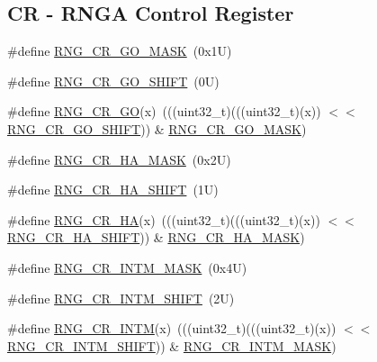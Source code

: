 \subsection*{CR -\/ R\+N\+GA Control Register}
\begin{DoxyCompactItemize}
\item 
\#define \mbox{\hyperlink{group___r_n_g___register___masks_ga2aebfd44952b9acb9854f17cbb241dc3}{R\+N\+G\+\_\+\+C\+R\+\_\+\+G\+O\+\_\+\+M\+A\+SK}}~(0x1\+U)
\item 
\#define \mbox{\hyperlink{group___r_n_g___register___masks_ga33164b67927c62a20a5cc0ebf24a6dec}{R\+N\+G\+\_\+\+C\+R\+\_\+\+G\+O\+\_\+\+S\+H\+I\+FT}}~(0\+U)
\item 
\#define \mbox{\hyperlink{group___r_n_g___register___masks_ga179fde31f28a4cd70ad1513eb466a0ee}{R\+N\+G\+\_\+\+C\+R\+\_\+\+GO}}(x)~(((uint32\+\_\+t)(((uint32\+\_\+t)(x)) $<$$<$ \mbox{\hyperlink{group___r_n_g___register___masks_ga33164b67927c62a20a5cc0ebf24a6dec}{R\+N\+G\+\_\+\+C\+R\+\_\+\+G\+O\+\_\+\+S\+H\+I\+FT}})) \& \mbox{\hyperlink{group___r_n_g___register___masks_ga2aebfd44952b9acb9854f17cbb241dc3}{R\+N\+G\+\_\+\+C\+R\+\_\+\+G\+O\+\_\+\+M\+A\+SK}})
\item 
\#define \mbox{\hyperlink{group___r_n_g___register___masks_ga771a9a36a3856ec15886952dd5881e67}{R\+N\+G\+\_\+\+C\+R\+\_\+\+H\+A\+\_\+\+M\+A\+SK}}~(0x2\+U)
\item 
\#define \mbox{\hyperlink{group___r_n_g___register___masks_ga003221e3c2c56d155f0144d99b9daa28}{R\+N\+G\+\_\+\+C\+R\+\_\+\+H\+A\+\_\+\+S\+H\+I\+FT}}~(1\+U)
\item 
\#define \mbox{\hyperlink{group___r_n_g___register___masks_ga229f4a80160cd677797326cee5eb8588}{R\+N\+G\+\_\+\+C\+R\+\_\+\+HA}}(x)~(((uint32\+\_\+t)(((uint32\+\_\+t)(x)) $<$$<$ \mbox{\hyperlink{group___r_n_g___register___masks_ga003221e3c2c56d155f0144d99b9daa28}{R\+N\+G\+\_\+\+C\+R\+\_\+\+H\+A\+\_\+\+S\+H\+I\+FT}})) \& \mbox{\hyperlink{group___r_n_g___register___masks_ga771a9a36a3856ec15886952dd5881e67}{R\+N\+G\+\_\+\+C\+R\+\_\+\+H\+A\+\_\+\+M\+A\+SK}})
\item 
\#define \mbox{\hyperlink{group___r_n_g___register___masks_gaeb6ea10a08f7c854d7a2d566afbc509a}{R\+N\+G\+\_\+\+C\+R\+\_\+\+I\+N\+T\+M\+\_\+\+M\+A\+SK}}~(0x4\+U)
\item 
\#define \mbox{\hyperlink{group___r_n_g___register___masks_ga3e492e16a9a75e903cc108e526b51d7f}{R\+N\+G\+\_\+\+C\+R\+\_\+\+I\+N\+T\+M\+\_\+\+S\+H\+I\+FT}}~(2\+U)
\item 
\#define \mbox{\hyperlink{group___r_n_g___register___masks_ga47b93c0137c2e27e1cbcc64146f72816}{R\+N\+G\+\_\+\+C\+R\+\_\+\+I\+N\+TM}}(x)~(((uint32\+\_\+t)(((uint32\+\_\+t)(x)) $<$$<$ \mbox{\hyperlink{group___r_n_g___register___masks_ga3e492e16a9a75e903cc108e526b51d7f}{R\+N\+G\+\_\+\+C\+R\+\_\+\+I\+N\+T\+M\+\_\+\+S\+H\+I\+FT}})) \& \mbox{\hyperlink{group___r_n_g___register___masks_gaeb6ea10a08f7c854d7a2d566afbc509a}{R\+N\+G\+\_\+\+C\+R\+\_\+\+I\+N\+T\+M\+\_\+\+M\+A\+SK}})
$$
\end{DoxyCompactItemize}
